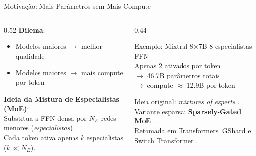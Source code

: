 \documentclass[aspectratio=169, xcolor=dvipsnames]{beamer}
\begin{document}
  \begin{frame}{Motivação: Mais Parâmetros sem Mais Compute}
    \begin{columns}[T]
      \begin{column}{0.52\textwidth}
        \textbf{Dilema}:
        \begin{itemize}
          \item Modelos maiores $\to$ melhor qualidade
          \item Modelos maiores $\to$ mais compute por token
        \end{itemize}
        \vspace{0.4em}
        \textbf{Ideia da Mistura de Especialistas (MoE)}:\\
        Substitua a FFN densa por $N_E$ redes menores (\textit{especialistas}).\\
        Cada token ativa apenas $k$ especialistas ($k \ll N_E$).
      \end{column}
      \begin{column}{0.44\textwidth}
        \begin{exampleblock}{Exemplo: Mixtral 8×7B}
          8 especialistas FFN\\
          Apenas 2 ativados por token\\
          $\to$ 46.7B parâmetros totais\\
          $\to$ compute $\approx$ 12.9B por token
        \end{exampleblock}
        \vspace{0.3em}
        {\footnotesize
        Ideia original: \textit{mixtures of experts} \cite{jacobs1991moe}.\\
        Variante esparsa: \textbf{Sparsely-Gated MoE} \cite{shazeer2017moe}.\\
        Retomada em Transformers: GShard \cite{lepikhin2021gshard} e Switch Transformer \cite{fedus2022switch}.\par}
      \end{column}
    \end{columns}
  \end{frame}
\end{document}
